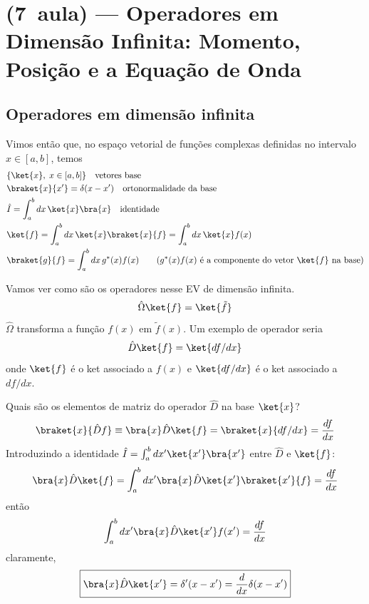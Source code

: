 \section*{(7\textordfeminine\ aula) --- Operadores em Dimensão Infinita: Momento, Posição e a Equação de Onda}

\subsection*{Operadores em dimensão infinita}

Vimos então que, no espaço vetorial de funções complexas definidas no intervalo $x \in [a,b]$, temos
\begin{align*}
&\{\ket{x}, \; x \in [a,b]\} \quad \text{vetores base} \\
&\braket{x}{x'} = \delta(x-x') \quad \text{ortonormalidade da base} \\
&\hat{I} = \int_a^b dx \,\ket{x}\bra{x} \quad \text{identidade} \\
&\ket{f} = \int_a^b dx \,\ket{x}\braket{x}{f} = \int_a^b dx \,\ket{x} f(x) \\
&\braket{g}{f} = \int_a^b dx \, g^*(x) f(x) \qquad \text{($g^*(x)f(x)$ é a componente do vetor $\ket{f}$ na base)}
\end{align*}

Vamos ver como são os operadores nesse EV de dimensão infinita.
\begin{equation}
\hat{\Omega}\ket{f} = \ket{\tilde{f}}
\label{eq:aula7_operador_geral}
\end{equation}
$\hat{\Omega}$ transforma a função $f(x)$ em $\tilde{f}(x)$. Um exemplo de operador seria
\begin{equation}
\hat{D}\ket{f} = \ket{df/dx}
\label{eq:aula7_operador_D}
\end{equation}
onde $\ket{f}$ é o ket associado a $f(x)$ e $\ket{df/dx}$ é o ket associado a $df/dx$.

Quais são os elementos de matriz do operador $\hat{D}$ na base $\ket{x}$?
\begin{equation}
\braket{x}{\hat{D}f} \equiv \bra{x}\hat{D}\ket{f} = \braket{x}{df/dx} = \frac{df}{dx}
\label{eq:aula7_D_elemento1}
\end{equation}
Introduzindo a identidade $\hat{I} = \int_a^b dx' \ket{x'}\bra{x'}$ entre $\hat{D}$ e $\ket{f}$:
\begin{equation}
\bra{x}\hat{D}\ket{f} = \int_a^b dx' \bra{x}\hat{D}\ket{x'}\braket{x'}{f} = \frac{df}{dx}
\label{eq:aula7_D_elemento2}
\end{equation}
então
\begin{equation}
\int_a^b dx' \bra{x}\hat{D}\ket{x'} f(x') = \frac{df}{dx}
\label{eq:aula7_D_elemento3}
\end{equation}
claramente,
\begin{equation}
\boxed{\bra{x}\hat{D}\ket{x'} = \delta'(x-x') = \frac{d}{dx}\delta(x-x')}
\label{eq:aula7_D_matriz}
\end{equation}

